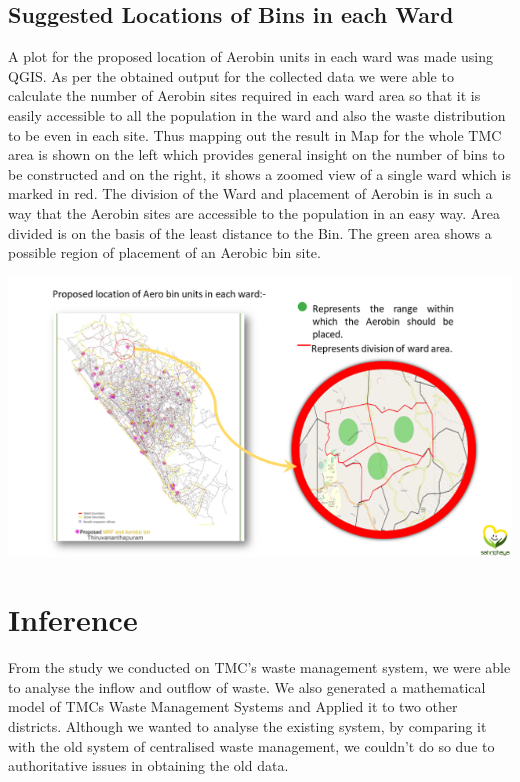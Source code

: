 \documentclass[12pt,a4paper]{  report}
\begin{document}
\section{Suggested Locations of Bins in each Ward}
\begin{justify}
	 A plot for the proposed location of Aerobin units in each ward was made using QGIS. As per the obtained output for the collected data we were able to calculate the number of Aerobin sites required in each ward area so that it is easily accessible to all the population in the ward and also the waste distribution to be even in each site. Thus mapping out the result in Map for the whole TMC area is shown on the left which provides general insight on the number of bins to be constructed and on the right, it shows a zoomed view of a single ward which is marked in red. The division of the Ward and placement of Aerobin is in such a way that the Aerobin sites are accessible to the population in an easy way. Area divided is on the basis of the least distance to the Bin. The green area shows a possible region of placement of an Aerobic bin site.
	 
	 \centering
	 \includegraphics[width=1\textwidth]{bin_loc}
\end{justify}

\chapter{\textbf{Inference}}
From the study we conducted on TMC’s waste management system, we were able to analyse the inflow and outflow of waste.
We also generated a mathematical model of TMCs Waste Management Systems and Applied it to two other districts.
Although we wanted to analyse the existing system, by comparing it with the old system of centralised waste management, we couldn’t do so due to authoritative issues in obtaining the old data.
\end{document}
